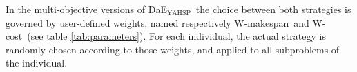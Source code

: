 \documentclass{llncs}
\newcommand{\DAEYAHSP}{{\sc DaE$_{\text{YAHSP}}$}}
\def\PARAMILS{{\sc ParamILS}}
\def\WMAKESPAN{{W-makespan}}
\def\WCOST{{W-cost}}
\begin{document}
In the multi-objective versions of \DAEYAHSP\, the choice between both strategies is governed by user-defined weights, named respectively \WMAKESPAN\ and \WCOST\ (see table \ref{tab:parameters}). For each individual, the actual strategy is randomly chosen according to those weights, and applied to all subproblems of the individual.

% 
\end{document}
